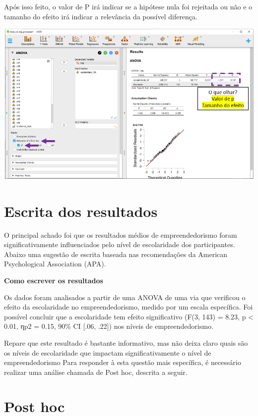 \documentclass[
]{book}
\begin{document}
Após isso feito, o valor de P irá indicar se a hipótese nula foi
rejeitada ou não e o tamanho do efeito irá indicar a relevância da
possível diferença.

\includegraphics{./img/cap_anova_resultados.png}

\hypertarget{escrita-dos-resultados-3}{%
\section{Escrita dos resultados}\label{escrita-dos-resultados-3}}

O principal achado foi que os resultados médios de empreendedorismo
foram significativamente influenciados pelo nível de escolaridade dos
participantes. Abaixo uma sugestão de escrita baseada nas recomendações
da American Psychological Association (APA).

\begin{writing}
\textbf{Como escrever os resultados}

Os dados foram analisados a partir de uma ANOVA de uma via que verificou
o efeito da escolaridade no empreendedorismo, medido por um escala
específica. Foi possível concluir que a escolaridade tem efeito
significativo (F(3, 143) = 8.23, p \textless{} 0.01, ηp2 = 0.15, 90\% CI
{[}.06, .22{]}) nos níveis de empreendedorismo.
\end{writing}

Repare que este resultado é bastante informativo, mas não deixa claro
quais são os níveis de escolaridade que impactam significativamente o
nível de empreendedorismo Para responder à esta questão mais específica,
é necessário realizar uma análise chamada de Post hoc, descrita a
seguir.

\hypertarget{post-hoc}{%
\section{Post hoc}\label{post-hoc}}
\end{document}
